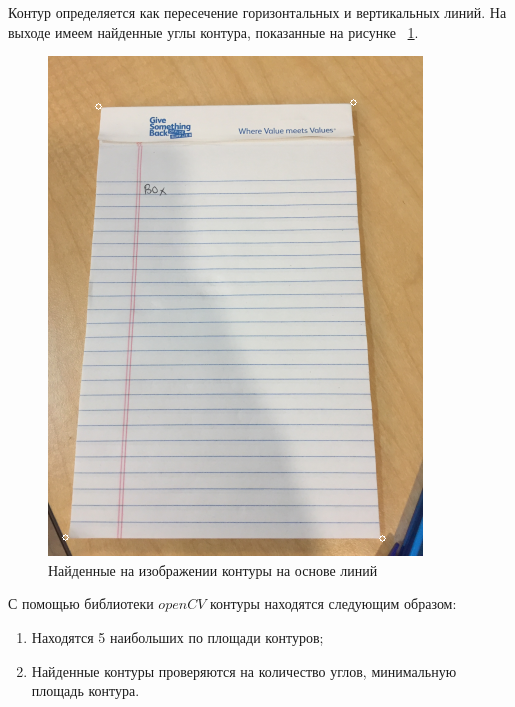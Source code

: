 Контур определяется как пересечение горизонтальных и вертикальных линий. На выходе имеем найденные углы контура, показанные на рисунке ~\ref{lsd_corners}.
\begin{figure}
    \includegraphics[scale=0.25]{img/perspective/corners.png}
    \caption{Найденные на изображении контуры на основе линий}
    \label{lsd_corners}
\end{figure}

С помощью библиотеки $openCV$ контуры находятся следующим образом:

\begin{enumerate}
    \item Находятся 5 наибольших по площади контуров;
    \item Найденные контуры проверяются на количество углов, минимальную площадь контура.
\end{enumerate}

